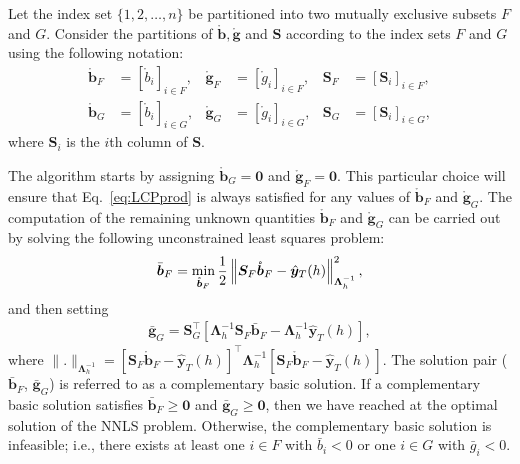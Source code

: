 \documentclass[11pt]{article}
\newcommand{\0}{\phantom{0}}
\begin{document}
Let the index set $\{1, 2, \dots, n\}$ be partitioned into two mutually exclusive subsets $F$ and $G$. Consider the partitions of $\mathring{\bm{b}}, \mathring{\bm{g}}$ and $\bm{S}$ according to the index sets $F$ and $G$ using the following notation:
\begin{align*}
	\mathring{\bm{b}}_{F} & = [\mathring{b}_{i}]_{i \in F}, & \mathring{\bm{g}}_{F} & = [\mathring{g}_{i}]_{i \in F}, & \bm{S}_{F} & = [\bm{S}_{i}]_{i \in F}, \\
	\mathring{\bm{b}}_{G} & = [\mathring{b}_{i}]_{i \in G}, & \mathring{\bm{g}}_{G} & = [\mathring{g}_{i}]_{i \in G}, & \bm{S}_{G} & = [\bm{S}_{i}]_{i \in G},
\end{align*}
where $\bm{S}_{i}$ is the $i$th column of $\bm{S}$.

The algorithm starts by assigning $\mathring{\bm{b}}_{G} = \bm{0}$ and $\mathring{\bm{g}}_{F} = \bm{0}$. This particular choice will ensure that Eq.~\eqref{eq:LCPprod} is always satisfied for any values of $\mathring{\bm{b}}_{F}$ and $\mathring{\bm{g}}_{G}$.
The computation of the remaining unknown quantities $\mathring{\bm{b}}_{F}$ and $\mathring{\bm{g}}_{G}$ can be carried out by solving the following unconstrained least squares problem:
\begin{align}
	\label{eq:basicquad}
	\bar{\bm{b}}_{F} = \operatornamewithlimits{min}_{\mathring{\bm{b}}_{F}} \frac{1}{2}\left\|\bm{S}_{F}\mathring{\bm{b}}_{F} - \hat{\bm{y}}_{T}(h)\right\|^{2}_{\bm{\Lambda}_{h}^{-1}},
\end{align}
and then setting
\begin{align}
	\label{eq:basicgrad}
	\bar{\bm{g}}_{G} = \bm{S}_{G}^\top[\bm{\Lambda}_{h}^{-1}\bm{S}_{F}\bar{\bm{b}}_{F} - \bm{\Lambda}_{h}^{-1}\hat{\bm{y}}_{T}(h)],
\end{align}
where $\|.\|_{\bm{\Lambda}_{h}^{-1}} = [\bm{S}_{F}\mathring{\bm{b}}_{F} - \hat{\bm{y}}_{T}(h)]^\top\bm{\Lambda}_{h}^{-1} [\bm{S}_{F}\mathring{\bm{b}}_{F} - \hat{\bm{y}}_{T}(h)]$. The solution pair ($\bar{\bm{b}}_{F}$, $\bar{\bm{g}}_{G}$) is referred to as a complementary basic solution. If a complementary basic solution satisfies $\bar{\bm{b}}_{F} \geq \bm{0}$ and $\bar{\bm{g}}_{G} \geq \bm{0}$, then we have reached at the optimal solution of the NNLS problem. Otherwise, the complementary basic solution is infeasible; i.e., there exists at least one $i \in F$ with $\bar{b}_{i} < 0$ or one $i \in G$ with $\bar{g}_{i} < 0$.
\end{document}
